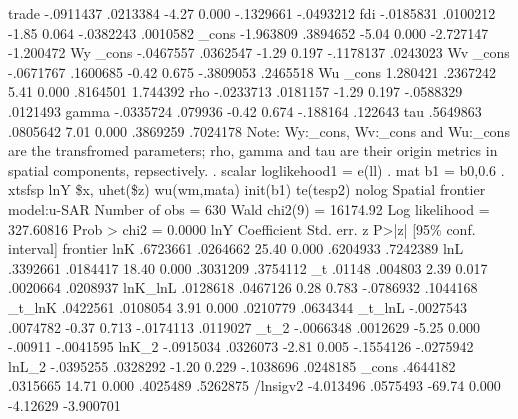        trade {\VBAR}  -.0911437   .0213384    -4.27   0.000    -.1329661   -.0493212
         fdi {\VBAR}  -.0185831   .0100212    -1.85   0.064    -.0382243    .0010582
       _cons {\VBAR}  -1.963809   .3894652    -5.04   0.000    -2.727147   -1.200472
Wy           {\VBAR}
       _cons {\VBAR}  -.0467557   .0362547    -1.29   0.197    -.1178137    .0243023
Wv           {\VBAR}
       _cons {\VBAR}  -.0671767   .1600685    -0.42   0.675    -.3809053    .2465518
Wu           {\VBAR}
       _cons {\VBAR}   1.280421   .2367242     5.41   0.000     .8164501    1.744392
         rho {\VBAR}  -.0233713   .0181157    -1.29   0.197    -.0588329    .0121493
       gamma {\VBAR}  -.0335724    .079936    -0.42   0.674     -.188164     .122643
         tau {\VBAR}   .5649863   .0805642     7.01   0.000     .3869259    .7024178
Note: Wy:_cons, Wv:_cons and Wu:_cons are the transfromed parameters;
      rho, gamma and tau are their origin metrics in spatial components, repsectively.
{\smallskip}
. scalar loglikehood1 =  e(ll)
{\smallskip}
. mat b1 = b0,0.6
{\smallskip}
. xtsfsp lnY \$x, uhet(\$z)  wu(wm,mata)  init(b1) te(tesp2)  nolog
{\smallskip}
Spatial frontier model:u-SAR                          Number of obs =      630
                                                      Wald chi2(9)  = 16174.92
Log likelihood = 327.60816                            Prob > chi2   =   0.0000
{\smallskip}
         lnY {\VBAR} Coefficient  Std. err.      z    P>|z|     [95\% conf. interval]
frontier     {\VBAR}
         lnK {\VBAR}   .6723661   .0264662    25.40   0.000     .6204933    .7242389
         lnL {\VBAR}   .3392661   .0184417    18.40   0.000     .3031209    .3754112
          _t {\VBAR}     .01148    .004803     2.39   0.017     .0020664    .0208937
     lnK_lnL {\VBAR}   .0128618   .0467126     0.28   0.783    -.0786932    .1044168
      _t_lnK {\VBAR}   .0422561   .0108054     3.91   0.000     .0210779    .0634344
      _t_lnL {\VBAR}  -.0027543   .0074782    -0.37   0.713    -.0174113    .0119027
        _t_2 {\VBAR}  -.0066348   .0012629    -5.25   0.000      -.00911   -.0041595
       lnK_2 {\VBAR}  -.0915034   .0326073    -2.81   0.005    -.1554126   -.0275942
       lnL_2 {\VBAR}  -.0395255   .0328292    -1.20   0.229    -.1038696    .0248185
       _cons {\VBAR}   .4644182   .0315665    14.71   0.000     .4025489    .5262875
    /lnsigv2 {\VBAR}  -4.013496   .0575493   -69.74   0.000     -4.12629   -3.900701

